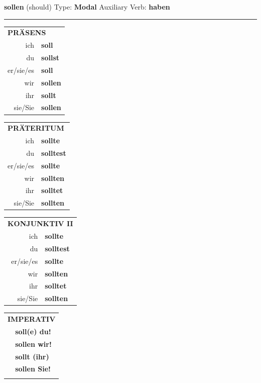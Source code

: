 \documentclass[10pt,a4paper]{revtex4-2}
\begin{document}
\begin{verbbox-modal}
    {\Large \bf sollen} (should) \hfill Type: \textbf{Modal} \hfill Auxiliary Verb: \textbf{haben} 
     \vspace{5pt}
    \hrule
    \vspace{5pt}
  \begin{tabular}{rl}
     \multicolumn{2}{l}{\textbf{PRÄSENS} }\\
    ich & \textbf{soll}\\
    du & \textbf{sollst}\\
    er/sie/es & \textbf{soll}\\
    wir & \textbf{sollen}\\
    ihr & \textbf{sollt}\\
    sie/Sie & \textbf{sollen}\\
  \end{tabular}
  \hfill
     \begin{tabular}{rl}
    \multicolumn{2}{l}{\textbf{PRÄTERITUM} }\\
    ich & \textbf{sollte}\\
    du & \textbf{solltest}\\
    er/sie/es & \textbf{sollte}\\
    wir & \textbf{sollten}\\
    ihr & \textbf{solltet}\\
    sie/Sie & \textbf{sollten}\\
  \end{tabular}
   \hfill
     \begin{tabular}{rl}
    \multicolumn{2}{l}{\textbf{KONJUNKTIV II} }\\
    ich & \textbf{sollte}\\
    du & \textbf{solltest}\\
    er/sie/es & \textbf{sollte}\\
    wir & \textbf{sollten}\\
    ihr & \textbf{solltet}\\
    sie/Sie & \textbf{sollten}\\
  \end{tabular}
  \hfill
  \begin{tabular}{rl}
     \multicolumn{2}{l}{\textbf{IMPERATIV} }\\
   & \textbf{soll(e) du!}\\
   & \textbf{sollen wir!}\\
   & \textbf{sollt (ihr)}\\
   & \textbf{sollen Sie!}\\
   & \vspace{10pt}
  \end{tabular}


\end{verbbox-modal}
\end{document}
